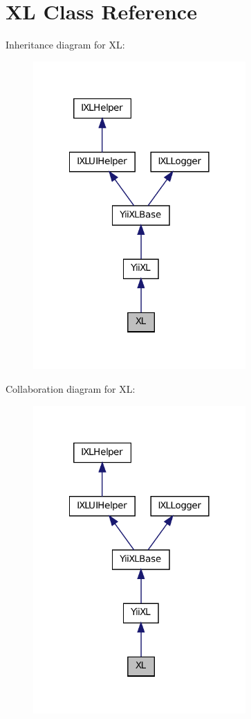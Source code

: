 \hypertarget{classXL}{
\section{XL Class Reference}
\label{classXL}
}


Inheritance diagram for XL:\nopagebreak
\begin{figure}[H]
\begin{center}
\leavevmode
\includegraphics[width=230pt]{classXL__inherit__graph}
\end{center}
\end{figure}


Collaboration diagram for XL:\nopagebreak
\begin{figure}[H]
\begin{center}
\leavevmode
\includegraphics[width=230pt]{classXL__coll__graph}
\end{center}
\end{figure}


